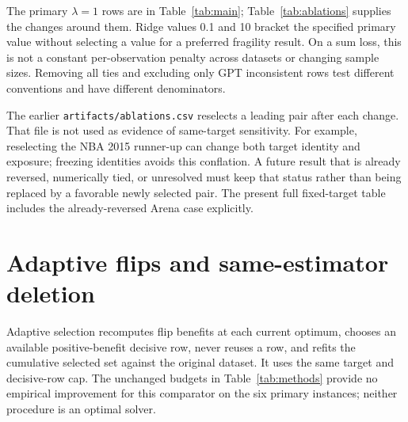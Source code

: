 The primary $\lambda=1$ rows are in Table~\ref{tab:main}; Table~\ref{tab:ablations} supplies the changes around them. Ridge values 0.1 and 10 bracket the specified primary value without selecting a value for a preferred fragility result. On a sum loss, this is not a constant per-observation penalty across datasets or changing sample sizes. Removing all ties and excluding only GPT inconsistent rows test different conventions and have different denominators.

The earlier \texttt{artifacts/ablations.csv} reselects a leading pair after each change. That file is not used as evidence of same-target sensitivity. For example, reselecting the NBA 2015 runner-up can change both target identity and exposure; freezing identities avoids this conflation. A future result that is already reversed, numerically tied, or unresolved must keep that status rather than being replaced by a favorable newly selected pair. The present full fixed-target table includes the already-reversed Arena case explicitly.

\section{Adaptive flips and same-estimator deletion}
\label{app:comparators}
\begin{table}[htbp]
\centering
\caption{Supplementary method comparison on original targets. Adaptive flips refit and relinearize after every new edit; frozen flips use the initial ordering. Deletion removes rows under the same sum-loss ridge estimator. ``Linear prediction'' is the frozen first-order cumulative-budget prediction, not a verified finite edit result. Counts across interventions are not exchangeable and do not reproduce published deletion experiments. Sources: \texttt{artifacts/method\_comparison.csv} and \texttt{artifacts/baseline.csv}; generated input: \texttt{paper/tables/methods.tex}.}
\label{tab:methods}
{\small}
\end{table}

Adaptive selection recomputes flip benefits at each current optimum, chooses an available positive-benefit decisive row, never reuses a row, and refits the cumulative selected set against the original dataset. It uses the same target and decisive-row cap. The unchanged budgets in Table~\ref{tab:methods} provide no empirical improvement for this comparator on the six primary instances; neither procedure is an optimal solver.

